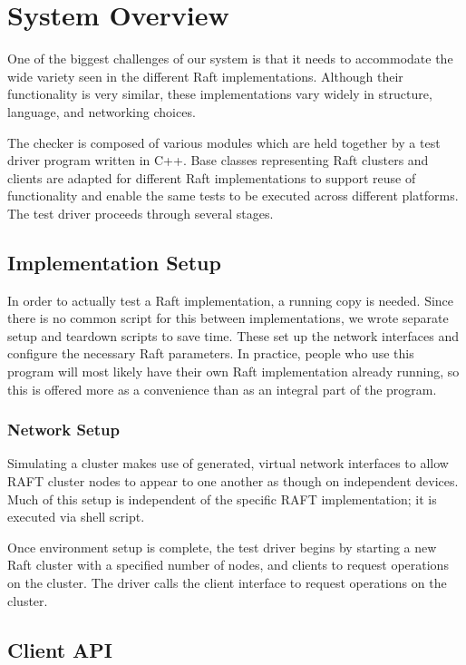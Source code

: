 \documentclass[UTF8]{article}
\begin{document}
\section{System Overview}
One of the biggest challenges of our system is that it needs to accommodate the wide variety seen in the different Raft implementations. Although their functionality is very similar, these implementations vary widely in structure, language, and networking choices.

The checker is composed of various modules which are held together by a test driver program written in C++. Base classes representing Raft clusters and clients are adapted for different Raft implementations to support reuse of functionality and enable the same tests to be executed across different platforms. The test driver proceeds through several stages.

\subsection{Implementation Setup}
In order to actually test a Raft implementation, a running copy is needed. Since there is no common script for this between implementations, we wrote separate setup and teardown scripts to save time. These set up the network interfaces and configure the necessary Raft parameters. In practice, people who use this program will most likely have their own Raft implementation already running, so this is offered more as a convenience than as an integral part of the program.

\subsubsection{Network Setup}

Simulating a cluster makes use of generated, virtual network interfaces to allow RAFT cluster nodes to appear to one another as though on independent devices. Much of this setup is independent of the specific RAFT implementation; it is executed via shell script.

Once environment setup is complete, the test driver begins by starting a new Raft cluster with a specified number of nodes, and clients to request operations on the cluster. The driver calls the client interface to request operations on the cluster.

\subsection{Client API}
\end{document}
